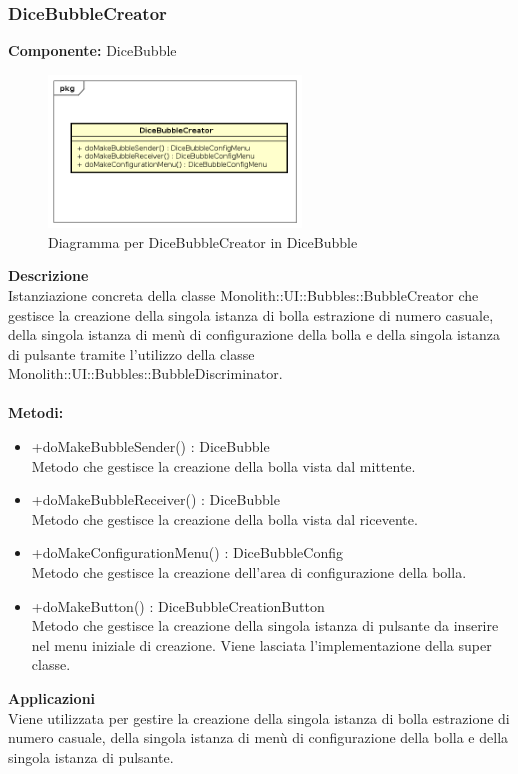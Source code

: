 \subsubsection{DiceBubbleCreator}
\textbf{Componente:}  DiceBubble\\
   \FloatBarrier
   \begin{figure}[ht]
   \centering
   \includegraphics[width=0.6\textwidth]{img/single-DiceBubbleCreator}
   \caption{{Diagramma per DiceBubbleCreator in DiceBubble}}
\end{figure}
\FloatBarrier
\textbf{Descrizione}\\
Istanziazione concreta della classe Monolith::UI::Bubbles::BubbleCreator che gestisce la creazione della singola istanza di bolla estrazione di numero casuale, della singola istanza di menù di configurazione della bolla e della singola istanza di pulsante tramite l'utilizzo della classe Monolith::UI::Bubbles::BubbleDiscriminator.
\\
\\
\textbf{Metodi:} 
\begin{itemize}
\item +doMakeBubbleSender() : DiceBubble 
\\
Metodo che gestisce la creazione della bolla vista dal mittente.
\item +doMakeBubbleReceiver() : DiceBubble 
\\
Metodo che gestisce la creazione della bolla vista dal ricevente.
\item +doMakeConfigurationMenu() : DiceBubbleConfig 
\\
Metodo che gestisce la creazione dell'area di configurazione della bolla.
\item +doMakeButton() : DiceBubbleCreationButton 
\\
Metodo che gestisce la creazione della singola istanza di pulsante da inserire nel menu iniziale di creazione. Viene lasciata l'implementazione della super classe.
\end{itemize} 


\textbf{Applicazioni}\\
Viene utilizzata per gestire la creazione della singola istanza di bolla estrazione di numero casuale, della singola istanza di menù di configurazione della bolla e della singola istanza di pulsante. 


